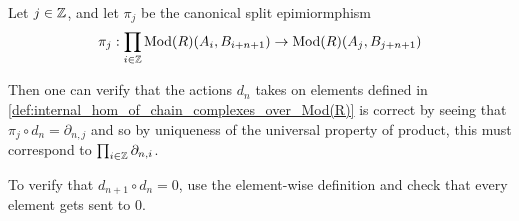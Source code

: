 \begin{remark}    
    Let \( j \in {\mathbb{Z}} \), and let \( \pi_j \) be the canonical split epimiormphism
    \[
        \pi_j: \prod_{i \in {\mathbb{Z}}} \operatorname{Mod}(R)(A_i, B_{i + n + 1}) \to \operatorname{Mod}(R)(A_j, B_{j + n + 1})
    \]

    Then one can verify that the actions \( d_n \) takes on elements defined in \autoref{def:internal_hom_of_chain_complexes_over_Mod(R)} is correct by seeing that \( \pi_j \circ d_n = \partial_{n, j} \) and so by uniqueness of the universal property of product, this must correspond to \( \prod_{i \in {\mathbb{Z}}} \partial_{n, i} \).

    To verify that \( d_{n + 1} \circ d_n = 0 \), use the element-wise definition and check that every element gets sent to \( 0 \).
\end{remark}


